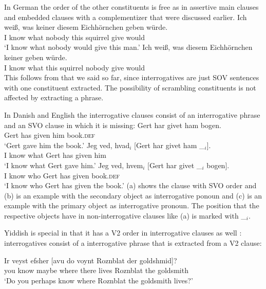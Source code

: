 In German the order of the other constituents is free as in assertive main clauses and embedded
clauses with a complementizer that were discussed earlier. 
\eal
\ex
\gll Ich weiß, was keiner diesem Eichhörnchen geben würde.\\
     I know    what nobody this squirrel give would\\
\glt `I know what nobody would give this man.'
\ex 
\gll Ich weiß, was diesem Eichhörnchen keiner geben würde.\\
     I know what this squirrel nobody give would\\
\zl
This follows from that we said so far, since interrogatives are just SOV sentences with one
constituent extracted. The possibility of scrambling constituents is not affected by extracting a phrase.

In Danish and English the interrogative clauses consist of an interrogative phrase and an SVO clause
in which it is missing:
\eal
\ex 
\gll Gert har givet ham bogen.\\
     Gert has given him book.\textsc{def}\\
\glt `Gert gave him the book.'
\ex
\gll Jeg ved, hvad$_i$ [Gert har givet ham \_$_i$].\\
     I know what \spacebr{}Gert has given him\\
\glt `I know what Gert gave him.'
\ex
\gll Jeg ved, hvem$_i$ [Gert har givet \_$_i$   bogen].\\
     I know who        \spacebr{}Gert has given {} book.\textsc{def}\\
\glt `I know who Gert has given the book.'
\zl
(a) shows the clause with SVO order and (b) is an example with the secondary object as
interrogative ponoun and (c) is an example with the primary object as interrogative
pronoun. The position that the respective objects have in non-interrogative clauses like (a)
is marked with \_$_i$.

Yiddish is special in that it has a V2 order in interrogative clauses as well \citep[Sections~4.1, 4.2]{Diesing90a}: interrogatives
consist of a interrogative phrase that is extracted from a V2 clause:

\ea
\gll Ir veyst efsher [avu            do    voynt Roznblat   der goldshmid]?\footnotemark\\
     you know maybe  \spacebr{}where there lives Roznblat the goldsmith\\
\glt `Do you perhaps know where Roznblat the goldsmith lives?' 
\z
%

